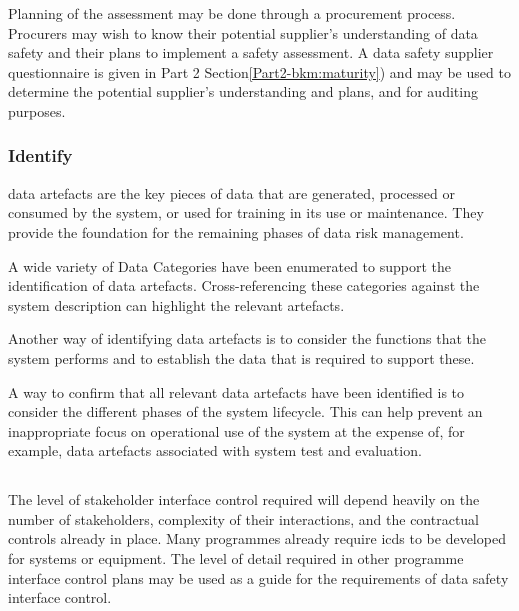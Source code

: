 Planning of the assessment may be done through a procurement process. Procurers may wish to know their potential supplier's understanding of data safety and their plans to implement a \gls{safety assessment}. A data safety supplier questionnaire is given in Part 2 Section\ref*{Part2-bkm:maturity}) and may be used to determine the potential supplier's understanding and plans, and for auditing purposes.

\subsubsection{Identify }
\Glspl{data artefact} are the key pieces of data that are generated, processed or consumed by the system, or used for training in its use or maintenance. They provide the foundation for the remaining phases of data risk management.

A wide variety of Data Categories have been enumerated to support the identification of \glspl{data artefact}. Cross-referencing these categories against the system description can highlight the relevant artefacts. 

Another way of identifying \glspl{data artefact} is to consider the functions that the system performs and to establish the data that is required to support these.

A way to confirm that all relevant \glspl{data artefact} have been identified is to consider the different phases of the system lifecycle. This can help prevent an inappropriate focus on operational use of the system at the expense of, for example, \glspl{data artefact} associated with system test and evaluation.

\subsection{}
The level of
\gls{stakeholder}
interface control required will depend heavily on the number of \glspl{stakeholder}, complexity of their interactions, and the contractual controls already in place. Many programmes already require \glspl{icd} to be developed for systems or equipment. The level of detail required in other programme interface control plans may be used as a guide for the requirements of data safety interface control. 

